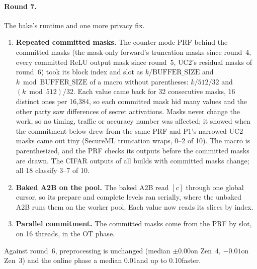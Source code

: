 \paragraph{Round 7.}\label{sec:triadround7} The bake's runtime and one more privacy fix.
\begin{enumerate}\itemsep1pt
\item \textbf{Repeated committed masks.} The counter-mode PRF behind the committed masks (the mask-only forward's
  truncation masks since round~4, every committed ReLU output mask since round~5, UC2's residual masks of round~6)
  took its block index and slot as $k / \mathrm{BUFFER\_SIZE}$ and $k \bmod \mathrm{BUFFER\_SIZE}$ of a macro without
  parentheses: $k / 512 / 32$ and $(k \bmod 512) / 32$. Each value came back for 32 consecutive masks, 16 distinct ones
  per 16,384, so each committed mask hid many values and the other party saw differences of secret activations. Masks
  never change the work, so no timing, traffic or accuracy number was affected; it showed when the commitment below drew
  from the same PRF and P1's narrowed UC2 masks came out tiny (SecureML truncation wraps, 0--2 of 10). The macro is
  parenthesized, and the PRF checks its outputs before the committed masks are drawn. The CIFAR outputs of all builds
  with committed masks change; all 18 classify 3--7 of 10.
\item \textbf{Baked A2B on the pool.} The baked A2B read $[c]$ through one global cursor, so its prepare and complete
  levels ran serially, where the unbaked A2B runs them on the worker pool. Each value now reads its slices by index.
\item \textbf{Parallel commitment.} The committed masks come from the PRF by slot, on 16 threads, in the OT phase.
\end{enumerate}
Against round~6, preprocessing is unchanged (median $\pm 0.00$\s on Zen~4, $-0.01$\s on Zen~3) and the online phase a
median 0.01\s and up to 0.10\s faster.


